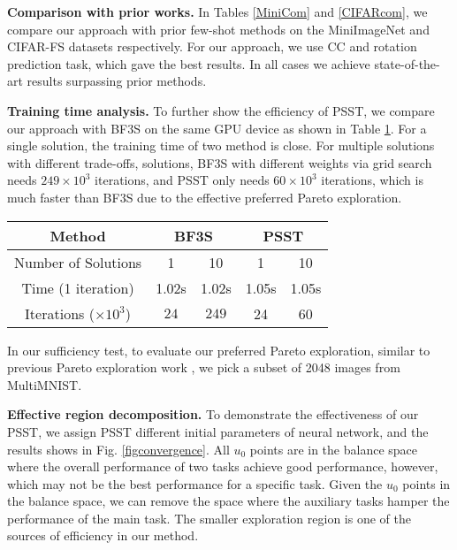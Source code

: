 \documentclass[final]{cvpr}
\begin{document}
 


\textbf{Comparison with prior works.} In Tables \ref{MiniCom} and \ref{CIFARcom}, we compare our approach with prior few-shot methods on the MiniImageNet and CIFAR-FS datasets respectively. 
For our approach, we use CC and rotation prediction task, which gave the best results. In all cases we achieve state-of-the-art results surpassing prior methods. 

\textbf{Training time analysis.}  To further show the efficiency of PSST, we compare our approach with BF3S on the same GPU device as shown in Table \ref{t1}. For a single solution, the training time of two method is close.
For multiple solutions with different trade-offs,  solutions, BF3S with different weights via grid search needs $249\times10^3$ iterations, and PSST only needs $60\times10^3$ iterations, which is much faster than BF3S due to the effective preferred Pareto exploration. 



\begin{table}
	\begin{center}
		\centering
		\begin{tabular}{c|c|c|c|c}
			\toprule[2pt]
			Method & \multicolumn{2}{c|}{BF3S \cite{GidarisBKPC19}} & \multicolumn{2}{c}{PSST}        \\ \hline
			\hline
			Number of Solutions  & 1   & 10   & 1   & 10     \\ \hline
			Time (1 iteration)  & 1.02s   & 1.02s   & 1.05s   & 1.05s     \\ \hline
			Iterations ($\times10^3$)  & $24$   & $249$  & 24  & 60    \\ 
			\bottomrule[2pt]
		\end{tabular}
	\end{center} 
\label{t1} 
\end{table}
 
In our sufficiency test, to evaluate our preferred Pareto exploration, similar to previous Pareto exploration work \cite{ma2020continuous}, we pick a subset of 2048 images from MultiMNIST.  



\textbf{Effective region decomposition.}  
To demonstrate the effectiveness of our PSST, we assign PSST different initial parameters of neural network, and the results shows in Fig. \ref{figconvergence}.
All $u_0$ points are in the balance space where the overall performance of two tasks achieve good performance, however, which may not be the best performance for a specific task.
Given the $u_0$ points in the balance space, we can remove the space where the auxiliary tasks hamper the performance of the main task.
The smaller exploration region is one of the sources of efficiency in our method.
 
\end{document}

